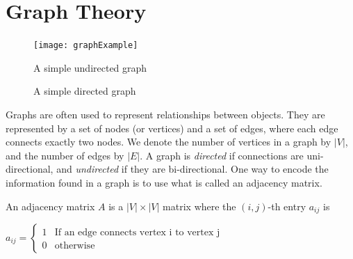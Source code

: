 
\label{lab:ImgSeg_eigenvalues}

\section*{Graph Theory}
\begin{figure}
\texttt{[image: graphExample]}
\caption{A simple undirected graph}
\label{fig:example_graph}
\end{figure}

\begin{figure}
\caption{A simple directed graph}
\end{figure}



Graphs are often used to represent relationships between objects.
They are represented by a set of nodes (or vertices) and a set of edges, where each edge connects exactly two nodes.
We denote the number of vertices in a graph by $|V|$, and the number of edges by $|E|$.
A graph is \emph{directed} if connections are uni-directional, and \emph{undirected} if they are bi-directional.
One way to encode the information found in a graph is to use what is called an adjacency matrix.
\begin{definition} An adjacency matrix $A$ is a $|V| \times |V|$ matrix where the $(i,j)$-th entry $a_{ij}$ is
\begin{center}
	$a_{ij} = \begin{cases} 1 & \mbox{If an edge connects vertex i to vertex j} \\ 0 & \mbox{otherwise} \end{cases}$
\end{center}
\end{definition}

